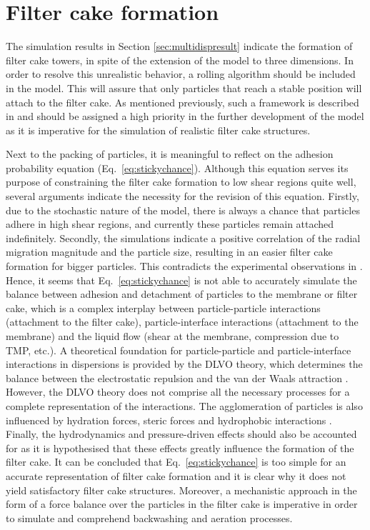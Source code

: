\section{Filter cake formation \label{sec:discFilter}}
The simulation results in Section \ref{sec:multidispresult} indicate the formation of filter cake towers, in spite of the extension of the model to three dimensions. In order to resolve this unrealistic behavior, a rolling algorithm should be included in the model. This will assure that only particles that reach a stable position will attach to the filter cake. As mentioned previously, such a framework is described in \cite{Smets} and should be assigned a high priority in the further development of the model as it is imperative for the simulation of realistic filter cake structures. \par
Next to the packing of particles, it is meaningful to reflect on the adhesion probability equation (Eq.\ \eqref{eq:stickychance}). Although this equation serves its purpose of constraining the filter cake formation to low shear regions quite well, several arguments indicate the necessity for the revision of this equation.
Firstly, due to the stochastic nature of the model, there is always a chance that particles adhere in high shear regions, and currently these particles remain attached indefinitely. Secondly, the simulations indicate a positive correlation of the radial migration magnitude and the particle size, resulting in an easier filter cake formation for bigger particles. This contradicts the experimental observations in \cite{Li1998}. %
Hence, it seems that Eq.\ \eqref{eq:stickychance} is not able to accurately simulate the balance between adhesion and detachment of particles to the membrane or filter cake, which is a complex interplay between particle-particle interactions (attachment to  the filter cake), particle-interface interactions (attachment to the membrane) and the liquid flow (shear at the membrane, compression due to \gls{TMP}, etc.). A theoretical foundation for particle-particle and particle-interface interactions in dispersions is provided by the \gls{DLVO} theory, which determines the balance between the electrostatic repulsion and the van der Waals attraction \citep{Lyklema1968}. However, the \gls{DLVO} theory does not comprise all the necessary processes for a complete representation of the interactions. The agglomeration of particles is also influenced by hydration forces, steric forces and hydrophobic interactions \citep{VanOss1989,Hermansson1999}. Finally, the hydrodynamics and pressure-driven effects should also be accounted for as it is hypothesised that these effects greatly influence the formation of the filter cake. It can be concluded that Eq.\ \eqref{eq:stickychance} is too simple for an accurate representation of filter cake formation and it is clear why it does not yield satisfactory filter cake structures. Moreover, a mechanistic approach in the form of a force balance over the particles in the filter cake is imperative in order to simulate and comprehend backwashing and aeration processes.
